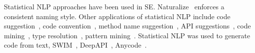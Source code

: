 Statistical NLP approaches have been used in SE.
%
Naturalize~\cite{barr-codeconvention-fse14}  enforces a
consistent naming style.
%
%
Other applications of statistical NLP include code
suggestion~\cite{hindle-icse12,tbcnn14}, code
convention~\cite{barr-codeconvention-fse14}, method name
suggestion~\cite{sutton-fse15}, API suggestions~\cite{raychev-pldi14},
code mining~\cite{sutton-msr13}, type resolution~\cite{icse18}, pattern mining~\cite{sutton-16}.
Statistical NLP was used to generate code from text, \eg
SWIM~\cite{Raghothaman-ICSE16}, DeepAPI~\cite{gu-fse16},
Anycode~\cite{anycode-oopsla15}.

